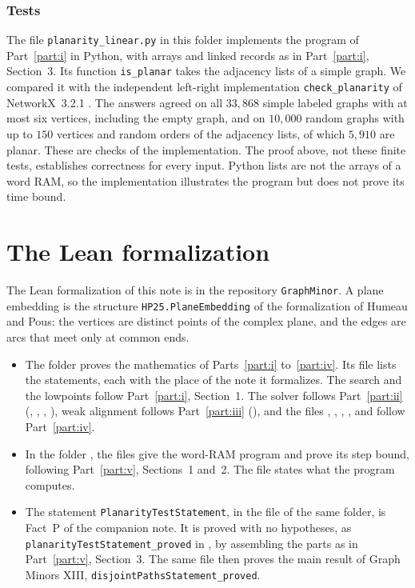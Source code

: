\documentclass[11pt]{article}
\begin{document}
\section{Tests}

The file \texttt{planarity\_linear.py} in this folder implements the program of
Part~\ref{part:i} in Python, with arrays and linked records as in
Part~\ref{part:i}, Section~3. Its function \texttt{is\_planar} takes the
adjacency lists of a simple graph. We compared it with the independent
left-right implementation \texttt{check\_planarity} of NetworkX~3.2.1
\cite{HSS08}. The answers agreed on all $33{,}868$ simple labeled graphs with
at most six vertices, including the empty graph, and on $10{,}000$ random
graphs with up to $150$ vertices and random orders of the adjacency lists, of
which $5{,}910$ are planar. These are checks of the implementation. The proof
above, not these finite tests, establishes correctness for every input. Python
lists are not the arrays of a word RAM, so the implementation illustrates the
program but does not prove its time bound.

\part{The Lean formalization}\label{part:vi}

The Lean formalization of this note is in the repository \texttt{GraphMinor}.
A plane embedding is the structure \texttt{HP25.PlaneEmbedding} of the
formalization of Humeau and Pous: the vertices are distinct points of the
complex plane, and the edges are arcs that meet only at common ends.
\begin{itemize}[nosep]
\item The folder  proves the mathematics of
Parts~\ref{part:i} to~\ref{part:iv}. Its file  lists the
statements, each with the place of the note it formalizes. The search and the
lowpoints follow Part~\ref{part:i}, Section~1. The solver follows
Part~\ref{part:ii} (, ,
, ), weak alignment follows
Part~\ref{part:iii} (), and the files
, , ,
,  and
 follow Part~\ref{part:iv}.
\item In the folder , the files
 give the word-RAM program and prove its step bound,
following Part~\ref{part:v}, Sections~1 and~2. The file
 states what the program computes.
\item The statement \texttt{PlanarityTestStatement}, in the file
 of the same folder, is Fact~P of the companion
note. It is proved with no hypotheses, as
\texttt{planarityTestStatement\_proved} in , by
assembling the parts as in Part~\ref{part:v}, Section~3. The same file then
proves the main result of Graph Minors XIII,
\texttt{disjointPathsStatement\_proved}.
\end{itemize}
\end{document}
